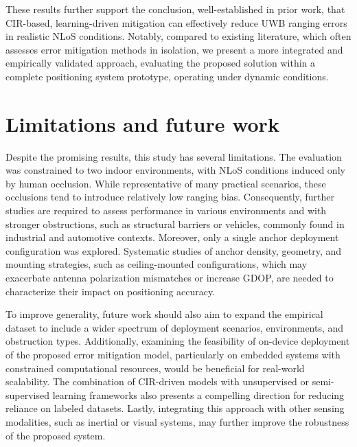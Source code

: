 These results further support the conclusion, well-established in prior work, that CIR-based, learning-driven mitigation can effectively reduce UWB ranging errors in realistic NLoS conditions. Notably, compared to existing literature, which often assesses error mitigation methods in isolation, we present a more integrated and empirically validated approach, evaluating the proposed solution within a complete positioning system prototype, operating under dynamic conditions.

\section{Limitations and future work}

Despite the promising results, this study has several limitations. The evaluation was constrained to two indoor environments, with NLoS conditions induced only by human occlusion. While representative of many practical scenarios, these occlusions tend to introduce relatively low ranging bias. Consequently, further studies are required to assess performance in various environments and with stronger obstructions, such as structural barriers or vehicles, commonly found in industrial and automotive contexts. Moreover, only a single anchor deployment configuration was explored. Systematic studies of anchor density, geometry, and mounting strategies, such as ceiling-mounted configurations, which may exacerbate antenna polarization mismatches or increase GDOP, are needed to characterize their impact on positioning accuracy.

To improve generality, future work should also aim to expand the empirical dataset to include a wider spectrum of deployment scenarios, environments, and obstruction types. Additionally, examining the feasibility of on-device deployment of the proposed error mitigation model, particularly on embedded systems with constrained computational resources, would be beneficial for real-world scalability. The combination of CIR-driven models with unsupervised or semi-supervised learning frameworks also presents a compelling direction for reducing reliance on labeled datasets. Lastly, integrating this approach with other sensing modalities, such as inertial or visual systems, may further improve the robustness of the proposed system.


